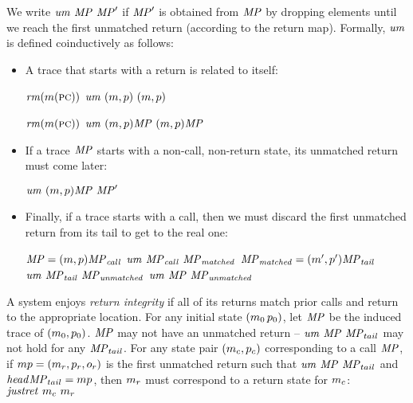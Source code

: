 \documentclass[acmsmall,review,anonymous]{acmart}\settopmatter{printfolios=true,printccs=false,printacmref=false}
\begin{document}
{
We write $\mathit{um}~\mathit{MP}~\mathit{MP}'$ if $\mathit{MP}'$ is
obtained from $\mathit{MP}$ by dropping elements until we reach the first unmatched return
(according to the return map).  Formally, $\mathit{um}$ is defined coinductively as follows:
\begin{itemize}
\item A trace that starts with a return is related to itself:

\begin{minipage}{.3\textwidth}
  \judgmenttwo{\(\callmap(\mach(\PCname)) = \bot\)}
              {\(\mathit{rm}(m(\textsc{pc}))\)}
              {\(\mathit{um} ~ (m,p) ~ (m,p)\)}
\end{minipage}
\hspace*{0.1\textwidth}
\begin{minipage}{.3\textwidth}
  \judgmenttwo{\(\callmap(\mach(\PCname)) = \bot\)}
              {\(\mathit{rm}(m(\textsc{pc}))\)}
              {\(\mathit{um} ~ (m,p)\mathit{MP} ~ (m,p)\mathit{MP}\)}
\end{minipage}

\item If a trace \(\mathit{MP}\) starts with a non-call, non-return state,
  its unmatched return must come later:

           {\(\mathit{um} ~ (m,p)\mathit{MP} ~ \mathit{MP}'\)}

\item Finally, if a trace starts with a call, then we must discard the first
  unmatched return from its tail to get to the real one:


             {\(\mathit{MP} = (m,p)\mathit{MP}_{\mathit{call}}\) \quad \(\mathit{um} ~ \mathit{MP}_{\mathit{call}} ~ \mathit{MP}_{\mathit{matched}}\)}
             {\(\mathit{MP}_{\mathit{matched}} = (m',p') \mathit{MP}_{\mathit{tail}}\) \quad
              \(\mathit{um} ~ \mathit{MP}_{\mathit{tail}} ~ \mathit{MP}_{\mathit{unmatched}}\)}
            {\(\mathit{um} ~ \mathit{MP} ~ \mathit{MP}_{\mathit{unmatched}}\)}
\end{itemize}
\ifspace
{}
\fi

A system enjoys {\em return integrity} if all of its returns match prior calls
and return to the appropriate location. For any initial state \((m_0\, p_0)\), let
\(\mathit{MP}\) be the induced trace of \((m_0,p_0)\).
\(\mathit{MP}\) may not have an unmatched return -- \(\mathit{um} ~ \mathit{MP} ~ \mathit{MP}_{tail}\)
may not hold for any \(\mathit{MP}_{tail}\). For any state pair \((m_c, p_c)\)
corresponding to a call \(\mathit{MP}\), if
\(mp = (m_r,p_r,o_r)\)
is the first unmatched return such that
\( \mathit{um} ~ \mathit{MP} ~ \mathit{MP}_{tail}\) and \(\mathit{head}{\mathit{MP}_{tail}} = mp\),
then $m_r$ must correspond to a return state for $m_c$:
\(\mathit{justret}\ m_c\ m_r\)

}
\end{document}
